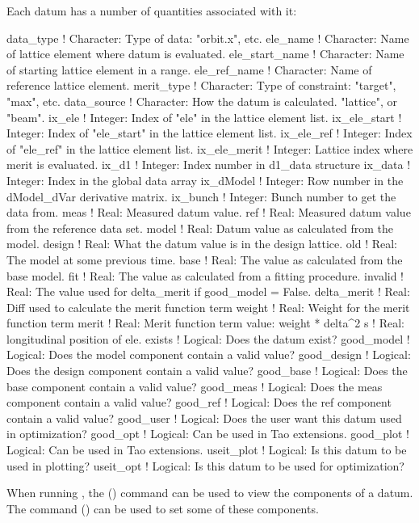 Each datum has a number of quantities associated with it:
\begin{example}
  data_type        ! Character: Type of data: "orbit.x", etc.
  ele_name         ! Character: Name of lattice element where datum is evaluated.
  ele_start_name   ! Character: Name of starting lattice element in a range.
  ele_ref_name     ! Character: Name of reference lattice element.
  merit_type       ! Character: Type of constraint: "target", "max", etc.
  data_source      ! Character: How the datum is calculated. "lattice", or "beam".
  ix_ele           ! Integer: Index of "ele" in the lattice element list.
  ix_ele_start     ! Integer: Index of "ele_start" in the lattice element list.
  ix_ele_ref       ! Integer: Index of "ele_ref" in the lattice element list.
  ix_ele_merit     ! Integer: Lattice index where merit is evaluated.
  ix_d1            ! Integer: Index number in d1_data structure
  ix_data          ! Integer: Index in the global data array
  ix_dModel        ! Integer: Row number in the dModel_dVar derivative matrix.
  ix_bunch         ! Integer: Bunch number to get the data from.
  meas             ! Real: Measured datum value. 
  ref              ! Real: Measured datum value from the reference data set.
  model            ! Real: Datum value as calculated from the model.
  design           ! Real: What the datum value is in the design lattice.
  old              ! Real: The model at some previous time.
  base             ! Real: The value as calculated from the base model.
  fit              ! Real: The value as calculated from a fitting procedure.
  invalid          ! Real: The value used for delta_merit if good_model = False.
  delta_merit      ! Real: Diff used to calculate the merit function term 
  weight           ! Real: Weight for the merit function term
  merit            ! Real: Merit function term value: weight * delta^2
  s                ! Real: longitudinal position of ele.
  exists           ! Logical: Does the datum exist?
  good_model       ! Logical: Does the model  component contain a valid value?
  good_design      ! Logical: Does the design component contain a valid value?
  good_base        ! Logical: Does the base   component contain a valid value?
  good_meas        ! Logical: Does the meas   component contain a valid value?
  good_ref         ! Logical: Does the ref    component contain a valid value?
  good_user        ! Logical: Does the user want this datum used in optimization?
  good_opt         ! Logical: Can be used in Tao extensions.
  good_plot        ! Logical: Can be used in Tao extensions.
  useit_plot       ! Logical: Is this datum to be used in plotting?
  useit_opt        ! Logical: Is this datum to be used for optimization?
\end{example}
When running \tao, the 
() command can be used to view the components of a datum. 
The  command () can be used to set some of these components.

